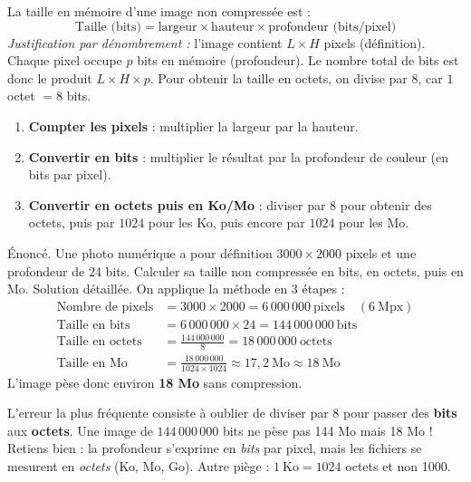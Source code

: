 \documentclass[11pt]{article}
\begin{document}
\begin{propriete}
La taille en mémoire d'une image non compressée est :
\[ \text{Taille (bits)} = \text{largeur} \times \text{hauteur} \times \text{profondeur (bits/pixel)} \]
\emph{Justification par dénombrement :} l'image contient $L \times H$ pixels (définition). Chaque pixel occupe $p$ bits en mémoire (profondeur). Le nombre total de bits est donc le produit $L \times H \times p$. Pour obtenir la taille en octets, on divise par 8, car $1$ octet $= 8$ bits.
\end{propriete}

\begin{methode}
\begin{enumerate}
  \item \textbf{Compter les pixels} : multiplier la largeur par la hauteur.
  \item \textbf{Convertir en bits} : multiplier le résultat par la profondeur de couleur (en bits par pixel).
  \item \textbf{Convertir en octets puis en Ko/Mo} : diviser par 8 pour obtenir des octets, puis par $1024$ pour les Ko, puis encore par $1024$ pour les Mo.
\end{enumerate}
\end{methode}

\begin{exoresolu}
Énoncé. Une photo numérique a pour définition $3000 \times 2000$ pixels et une profondeur de 24 bits. Calculer sa taille non compressée en bits, en octets, puis en Mo.
\tcblower
Solution détaillée. On applique la méthode en 3 étapes :
\begin{align*}
\text{Nombre de pixels} &= 3000 \times 2000 = 6\,000\,000~\text{pixels} \quad (6~\text{Mpx})\\
\text{Taille en bits} &= 6\,000\,000 \times 24 = 144\,000\,000~\text{bits}\\
\text{Taille en octets} &= \frac{144\,000\,000}{8} = 18\,000\,000~\text{octets}\\
\text{Taille en Mo} &= \frac{18\,000\,000}{1024 \times 1024} \approx 17,2~\text{Mo} \approx 18~\text{Mo}
\end{align*}
L'image pèse donc environ \textbf{18 Mo} sans compression.
\end{exoresolu}

\begin{attention}
L'erreur la plus fréquente consiste à oublier de diviser par 8 pour passer des \textbf{bits} aux \textbf{octets}. Une image de $144\,000\,000$ bits ne pèse pas 144 Mo mais 18 Mo ! Retiens bien : la profondeur s'exprime en \emph{bits} par pixel, mais les fichiers se mesurent en \emph{octets} (Ko, Mo, Go). Autre piège : $1~\text{Ko} = 1024$ octets et non 1000.
\end{attention}
\end{document}
